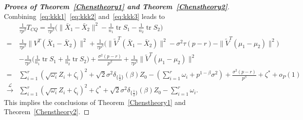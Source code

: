 \documentclass[review]{elsarticle}
\DeclareMathOperator{\mytr}{tr}
\theoremstyle{plain}
\theoremstyle{definition}
\theoremstyle{remark}
\begin{document}
\begin{proof}[\textbf{Proves of Theorem~\ref{Chenstheory1} and Theorem~\ref{Chenstheory2}}]
    Combining~\eqref{eq:kkk1}~\eqref{eq:kkk2} and~\eqref{eq:kkk3} leads to
    $$
    \begin{aligned}
        &\frac{1}{\tau p^{\beta}} T_{CQ}
        =\frac{1}{\tau p^{\beta}}\big(\|\bar{X}_1-\bar{X}_2\|^2-\frac{1}{n_1}\mytr S_1-\frac{1}{n_2}\mytr S_2\big)\\
        =&
        \frac{1}{\tau p^{\beta}}{\|V^T(\bar{X}_1-\bar{X}_2)\|^2}+
        \frac{1}{\tau p^{\beta}} \big({\|\tilde{V}^T(\bar{X}_1-\bar{X}_2)\|^2-\sigma^2 \tau(p-r)-\|\tilde{V}^T(\mu_1-\mu_2)\|^2}\big)\\
        &-\frac{1}{\tau p^{\beta}}\Big(\frac{1}{n_1}\mytr S_1+\frac{1}{n_2}\mytr S_2\Big)+\frac{\sigma^2 (p-r)}{p^\beta}+\frac{1}{\tau p^\beta}\|\tilde{V}^T(\mu_1-\mu_2)\|^2\\
        =&
        \sum_{i=1}^r (\sqrt{\omega_i} Z_i+\zeta_i)^2+
   \sqrt{2} \sigma^2 \delta_{\{\frac{1}{2}\}}(\beta)Z_0
        -
        (\sum_{i=1}^r \omega_i+p^{1-\beta}\sigma^2)
        +\frac{\sigma^2 (p-r)}{p^\beta}+\zeta^*+o_P(1)\\
        \xrightarrow{\mathcal{L}}&
        \sum_{i=1}^r (\sqrt{\omega_i} Z_i+\zeta_i)^2+
\zeta^*+
    \sqrt{2}\sigma^2 \delta_{\{\frac{1}{2}\}}(\beta)Z_0
        -
        \sum_{i=1}^r \omega_i.
    \end{aligned}
    $$
    This implies the conclusions of Theorem~\ref{Chenstheory1} and Theorem~\ref{Chenstheory2}.

%

\end{proof}
\end{document}
